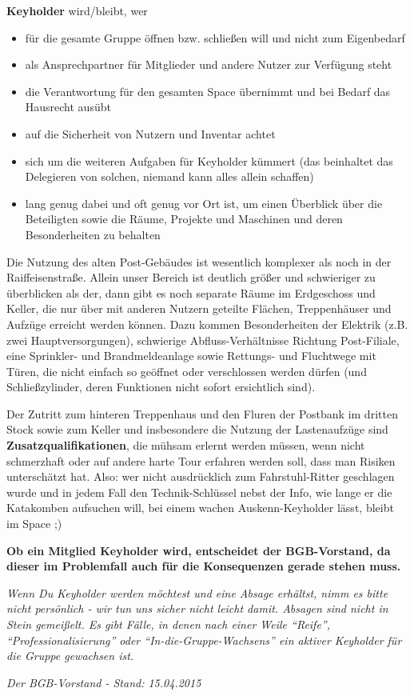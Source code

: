 \large
\textbf{Keyholder} wird/bleibt, wer

\begin{itemize}
	\item{für die gesamte Gruppe öffnen bzw. schließen will und nicht zum Eigenbedarf}
	\item{als Ansprechpartner für Mitglieder und andere Nutzer zur Verfügung steht}
	\item{die Verantwortung für den gesamten Space übernimmt und bei Bedarf das Hausrecht ausübt}
	\item{auf die Sicherheit von Nutzern und Inventar achtet}
	\item{sich um die weiteren Aufgaben für Keyholder kümmert (das beinhaltet das Delegieren von solchen, niemand kann alles allein schaffen)}
	\item{lang genug dabei und oft genug vor Ort ist, um einen Überblick über die Beteiligten sowie die Räume, Projekte und Maschinen und deren Besonderheiten zu behalten}
\end{itemize}

Die Nutzung des alten Post-Gebäudes ist wesentlich komplexer als noch in  der Raiffeisenstraße. Allein unser Bereich ist deutlich größer und  schwieriger zu überblicken als der, dann gibt es noch separate Räume im  Erdgeschoss und Keller, die nur über mit anderen Nutzern geteilte  Flächen, Treppenhäuser und Aufzüge erreicht werden können. Dazu kommen Besonderheiten der Elektrik (z.B. zwei Hauptversorgungen), schwierige Abfluss-Verhältnisse Richtung Post-Filiale, eine Sprinkler- und Brandmeldeanlage sowie Rettungs- und Fluchtwege mit Türen, die nicht einfach so geöffnet oder verschlossen werden dürfen (und Schließzylinder, deren Funktionen nicht sofort ersichtlich sind).

Der Zutritt zum hinteren Treppenhaus und den Fluren der Postbank im dritten Stock sowie zum Keller und insbesondere die Nutzung der Lastenaufzüge sind \textbf{Zusatzqualifikationen}, die mühsam erlernt werden müssen, wenn nicht schmerzhaft oder auf andere harte Tour erfahren werden soll, dass man Risiken unterschätzt hat. Also: wer nicht ausdrücklich zum Fahrstuhl-Ritter geschlagen wurde und in jedem Fall den Technik-Schlüssel nebst der Info, wie lange er die Katakomben aufsuchen will, bei einem wachen Auskenn-Keyholder lässt, bleibt im Space ;)

\textbf{Ob ein Mitglied Keyholder wird, entscheidet der BGB-Vorstand, da dieser im Problemfall auch für die Konsequenzen gerade stehen muss.}

\textit{Wenn Du Keyholder werden möchtest und eine Absage erhältst, nimm es bitte nicht persönlich - wir tun uns sicher nicht leicht damit. Absagen sind nicht in Stein gemeißelt. Es gibt Fälle, in denen nach einer Weile “Reife”, “Professionalisierung” oder “In-die-Gruppe-Wachsens” ein aktiver Keyholder für die Gruppe gewachsen ist.}

\begin{center}
	\textit{Der BGB-Vorstand - Stand: 15.04.2015}
\end{center}